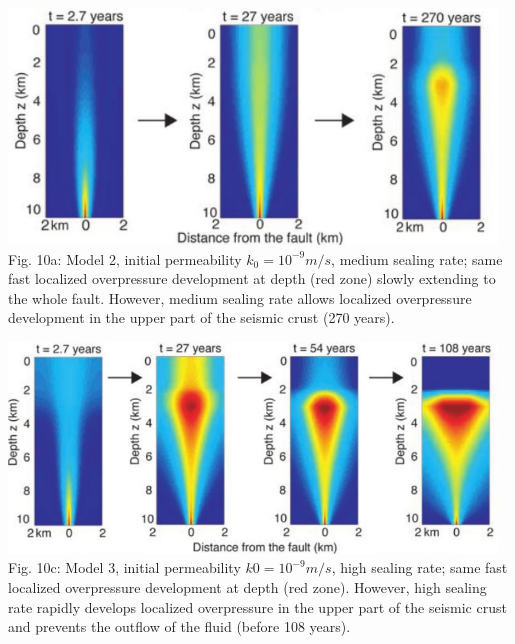 \begin{center}
\includegraphics[width=13cm]{python_codes/fieldstone_126/images/grfr03_10b}\\
{\captionfont Fig. 10a:
Model 2, initial permeability $k_0 = 10^{-9} m/s$, medium sealing rate; same fast localized
overpressure development at depth (red zone) slowly extending to the whole fault. However, 
medium sealing rate allows localized overpressure development in the upper part 
of the seismic crust (270 years). 
}
\end{center}

\begin{center}
\includegraphics[width=13cm]{python_codes/fieldstone_126/images/grfr03_10c}\\
{\captionfont Fig. 10c:
Model 3, initial permeability $k0 =10^{-9} m/s$, high sealing rate; same fast localized overpressure 
development at depth (red zone). However, high sealing rate rapidly develops localized overpressure 
in the upper part of the seismic crust and prevents the outflow of the fluid (before 108 years). 
}
\end{center}


